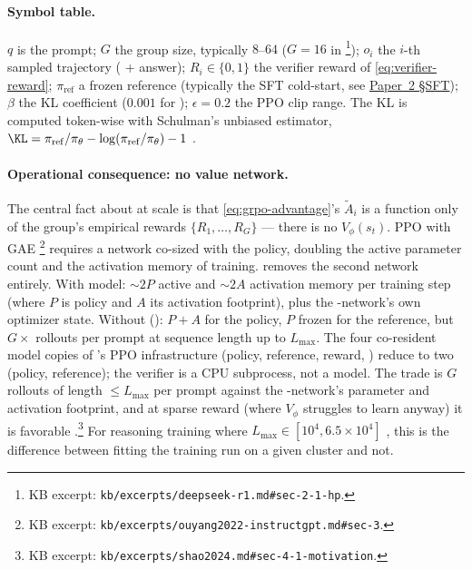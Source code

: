\paragraph{Symbol table.} $q$ is the prompt; $G$ the group size,
typically $8$--$64$ ($G = 16$ in  \citep[\S
2.1]{deepseek-r1}\footnote{KB excerpt:
\nolinkurl{kb/excerpts/deepseek-r1.md#sec-2-1-hp}.}); $o_i$ the $i$-th
sampled trajectory ( + answer); $R_i \in \{0, 1\}$ the
verifier reward of \cref{eq:verifier-reward}; $\pi_\mathrm{ref}$ a
frozen reference (typically the SFT cold-start, see \hyperref[P2-sec:sft]{Paper~2 §SFT});
$\beta$ the KL coefficient ($0.001$ for 
\citep[\S 2.1]{deepseek-r1}); $\epsilon = 0.2$ the PPO clip range. The
KL is computed token-wise with Schulman's unbiased estimator,
$\KL = \pi_\mathrm{ref}/\pi_\theta - \log(\pi_\mathrm{ref}/\pi_\theta) - 1$
\citep[\S 4.1]{shao2024}.

\paragraph{Operational consequence: no value network.} The central
fact about  at  scale is that
\cref{eq:grpo-advantage}'s $\tilde{A}_i$ is a function only of the
group's empirical rewards $\{R_1, \ldots, R_G\}$ --- there is no
$V_\phi(s_t)$. PPO with GAE \citep[\S
3.5]{ouyang2022-instructgpt}\footnote{KB excerpt:
\nolinkurl{kb/excerpts/ouyang2022-instructgpt.md#sec-3}.} requires a 
network co-sized with the policy, doubling the active parameter count
and the activation memory of training.  removes the second network
entirely. With  model: $\sim\!2P$ active  and $\sim\!2A$
activation memory per training step (where $P$ is policy  and
$A$ its activation footprint), plus the -network's own optimizer
state. Without (): $P + A$ for the policy, $P$ frozen for the
reference, but $G \times$ rollouts per prompt at sequence length up to
$L_\mathrm{max}$. The four co-resident model copies of 's PPO
infrastructure (policy, reference, reward, ) reduce to two
(policy, reference); the verifier is a CPU subprocess, not a model.
The trade is $G$ rollouts of length $\le L_\mathrm{max}$ per prompt
against the -network's parameter and activation footprint, and at
sparse reward (where $V_\phi$ struggles to learn anyway) it is
favorable \citep[\S 4.1]{shao2024}.\footnote{KB excerpt:
\nolinkurl{kb/excerpts/shao2024.md#sec-4-1-motivation}.} For
reasoning training where $L_\mathrm{max} \in [10^4, 6.5 \times 10^4]$
\citep[\S 2.1]{deepseek-r1}, this is the difference between fitting the
training run on a given cluster and not.

